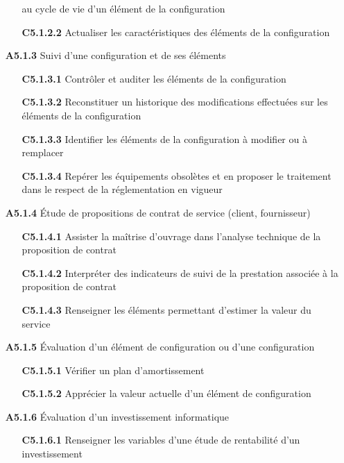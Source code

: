 \documentclass[12pt,a4paper,oneside,titlepage,final]{article}
\begin{document}
\begin{enumerate}
\begin{itemize}
    au cycle de vie d'un élément de la configuration
    \item [\textbf{C5.1.2.2}] Actualiser les caractéristiques des
    éléments de la configuration
  \end{itemize}
  \item [\textbf{A5.1.3}] Suivi d'une configuration et de ses éléments
  \begin{itemize}
    \item [\textbf{C5.1.3.1}] Contrôler et auditer les éléments
    de la configuration
    \item [\textbf{C5.1.3.2}] Reconstituer un historique des
    modifications effectuées sur les éléments de la configuration
    \item [\textbf{C5.1.3.3}] Identifier les éléments de la
    configuration à modifier ou à remplacer
    \item [\textbf{C5.1.3.4}] Repérer les équipements obsolètes et en
    proposer le traitement dans le respect de la réglementation en
    vigueur
  \end{itemize}
  \item [\textbf{A5.1.4}] Étude de propositions de contrat de service
  (client, fournisseur)
  \begin{itemize}
    \item [\textbf{C5.1.4.1}] Assister la maîtrise d'ouvrage
    dans l'analyse technique de la proposition de contrat
    \item [\textbf{C5.1.4.2}] Interpréter des indicateurs de suivi de
    la prestation associée à la proposition de contrat
    \item [\textbf{C5.1.4.3}] Renseigner les éléments permettant
    d'estimer la valeur du service
  \end{itemize}
  \item [\textbf{A5.1.5}] Évaluation d'un élément de configuration ou
  d'une configuration
  \begin{itemize}
    \item [\textbf{C5.1.5.1}] Vérifier un plan d'amortissement
    \item [\textbf{C5.1.5.2}] Apprécier la valeur actuelle d'un
    élément de configuration
  \end{itemize}
  \item [\textbf{A5.1.6}] Évaluation d'un investissement informatique
  \begin{itemize}
    \item [\textbf{C5.1.6.1}] Renseigner les variables d'une
    étude de rentabilité d'un investissement

\end{itemize}
\end{enumerate}
\end{document}
